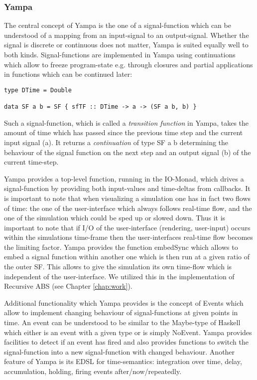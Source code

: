 \subsubsection{Yampa}
The central concept of Yampa is the one of a signal-function which can be understood of a mapping from an input-signal to an output-signal. Whether the signal is discrete or continuous does not matter, Yampa is suited equally well to both kinds. Signal-functions are implemented in Yampa using continuations which allow to freeze program-state e.g. through closures and partial applications in functions which can be continued later:
\begin{lstlisting}[]
type DTime = Double

data SF a b = SF { sfTF :: DTime -> a -> (SF a b, b) }
\end{lstlisting}
Such a signal-function, which is called a \textit{transition function} in Yampa, takes the amount of time which has passed since the previous time step and the current input signal (a). It returns a \textit{continuation} of type SF a b determining the behaviour of the signal function on the next step and an output signal (b) of the current time-step. 

Yampa provides a top-level function, running in the IO-Monad, which drives a signal-function by providing both input-values and time-deltas from callbacks. It is important to note that when visualizing a simulation one has in fact two flows of time: the one of the user-interface which always follows real-time flow, and the one of the simulation which could be sped up or slowed down. Thus it is important to note that if I/O of the user-interface (rendering, user-input) occurs within the simulations time-frame then the user-interfaces real-time flow becomes the limiting factor. Yampa provides the function embedSync which allows to embed a signal function within another one which is then run at a given ratio of the outer SF. This allows to give the simulation its own time-flow which is independent of the user-interface. We utilized this in the implementation of Recursive ABS (see Chapter \ref{chap:work}).

Additional functionality which Yampa provides is the concept of Events which allow to implement changing behaviour of signal-functions at given points in time. An event can be understood to be similar to the Maybe-type of Haskell which either is an event with a given type or is simply NoEvent. Yampa provides facilities to detect if an event has fired and also provides functions to switch the signal-function into a new signal-function with changed behaviour. Another feature of Yampa is its EDSL for time-semantics: integration over time, delay, accumulation, holding, firing events after/now/repeatedly.

